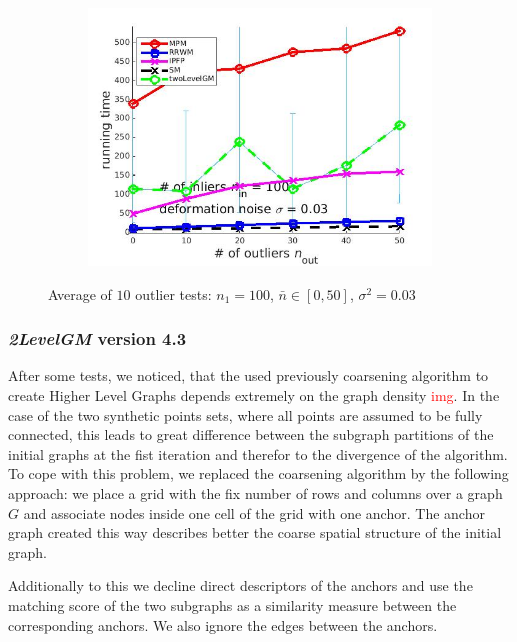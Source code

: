 \documentclass[
	fontsize=12pt,
	paper=a4,
	twoside=false,
	numbers=noenddot,
	plainheadsepline,
	toc=listof,
	toc=bibliography
]{scrartcl}
\newcommand\ToDo[1]{\textcolor{red}{#1}}
\begin{document}
\begin{figure}[h]
\begin{subfigure}[b]{0.3\textwidth}
		\includegraphics[scale=0.25]{"fig_ver2608/syntheticPointSets/ver4.2.1/outliertest_n50/time_avg10t"} 
	\end{subfigure} 	
	\caption{Average of $10$ outlier tests: $n_1=100$, $\bar{n}\in[0,50]$, $\sigma^2=0.03$}
	\label{fig:test3_ver421}
\end{figure}

\FloatBarrier

\subsubsection{\emph{2LevelGM} version 4.3}

After some tests, we noticed, that the used previously coarsening algorithm to create Higher Level Graphs depends extremely on the graph density \ToDo{img}. In the case of the two synthetic points sets, where all points are assumed to be fully connected, this leads to great difference between the subgraph partitions of the initial graphs at the fist iteration and therefor to the divergence of the algorithm. 
To cope with this problem, we replaced the coarsening algorithm by the following approach: we place a grid with the fix number of rows and columns over a graph $G$ and associate nodes inside one cell of the grid with one anchor. The anchor graph created this way describes better the coarse spatial structure of the initial graph.

Additionally to this we decline direct descriptors of the anchors and use the matching score of the two subgraphs as a similarity measure between the corresponding anchors. We also ignore the edges between the anchors. 
\end{document}
